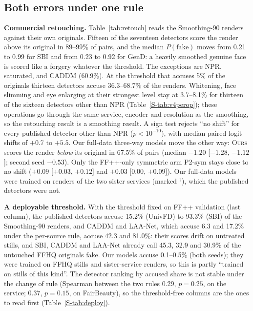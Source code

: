 \documentclass[conference]{IEEEtran}
\newcommand{\ours}{\textsc{Ours}}
\begin{document}
\subsection{Both errors under one rule}
\label{sec:measure}
\textbf{Commercial retouching.} Table~\ref{tab:retouch} reads the Smoothing-90 renders against their own originals. Fifteen of
the seventeen detectors score the render above its original in 89--99\% of pairs, and the median $P(\text{fake})$ moves from
0.21 to 0.99 for SBI and from 0.23 to 0.92 for GenD: a heavily smoothed genuine face is scored like a forgery whatever the
threshold. The exceptions are NPR, saturated, and CADDM (60.9\%). At the threshold that accuses 5\% of the originals thirteen
detectors accuse 36.3--68.7\% of the renders. Whitening, face slimming and eye enlarging at their strongest level stay at
3.7--8.1\% for thirteen of the sixteen detectors other than NPR (Table~\ref{S-tab:v4perop}); these operations go through the same
service, encoder and resolution as the smoothing, so the retouching result is a smoothing result. A sign test rejects ``no
shift'' for every published detector other than NPR ($p<10^{-10}$), with median paired logit shifts of $+0.7$ to $+5.5$. Our
full-data three-way models move the other way: \ours{} scores the render \emph{below} its original in 67.5\% of pairs (median
$-1.20$ [$-1.28$, $-1.12$]; second seed $-0.53$). Only the FF++-only symmetric arm P2-sym stays close to no shift ($+0.09$
[$+0.03$, $+0.12$] and $+0.03$ [$0.00$, $+0.09$]). Our full-data models were trained on renders of the two sister services
(marked $^\dagger$), which the published detectors were not.

\textbf{A deployable threshold.} With the threshold fixed on FF++ validation (last column), the published detectors accuse
15.2\% (UnivFD) to 93.3\% (SBI) of the Smoothing-90 renders, and CADDM and LAA-Net, which accuse 6.3 and 17.2\% under the
per-source rule, accuse 42.3 and 81.0\%: their scores drift on untreated stills, and SBI, CADDM and LAA-Net already call 45.3,
32.9 and 30.9\% of the untouched FFHQ originals fake. Our models accuse 0.1--0.5\% (both seeds); they were trained on FFHQ
stills and sister-service renders, so this is partly ``trained on stills of this kind''. The detector ranking by accused share
is not stable under the change of rule (Spearman between the two rules 0.29, $p=0.25$, on the service; 0.37, $p=0.15$, on
FairBeauty), so the threshold-free columns are the ones to read first (Table~\ref{S-tab:deploy}).
\end{document}
